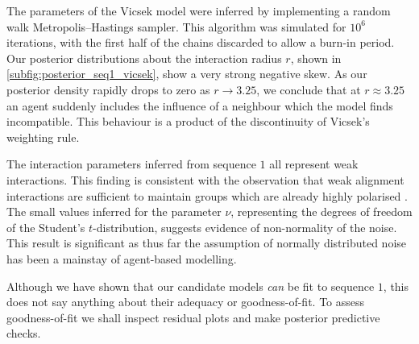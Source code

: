 The parameters of the Vicsek model were inferred by implementing a random walk
Metropolis--Hastings sampler. This algorithm was simulated for $10^6$
iterations, with the first half of the chains discarded to allow a burn-in
period. Our posterior distributions about the interaction radius $r$, shown in
\cref{subfig:posterior_seq1_vicsek}, show a very strong negative skew. As our
posterior density rapidly drops to zero as $r\rightarrow3.25$, we conclude  
that at $r\approx3.25$ an agent suddenly includes the influence of a neighbour
which the model finds incompatible. This behaviour is a product of the
discontinuity of Vicsek's weighting rule.

The interaction parameters inferred from sequence $1$ all represent weak
interactions. This finding is consistent with the observation that weak
alignment interactions are sufficient to maintain groups which are already
highly polarised \parencite{jhawar20}. The small values inferred for the
parameter $\nu$, representing the degrees of freedom of the Student's
$t$-distribution, suggests evidence of non-normality of the noise. This result
is significant as thus far the assumption of normally distributed noise has
been a mainstay of agent-based modelling.

Although we have shown that our candidate models \emph{can} be fit to sequence
$1$, this does not say anything about their adequacy or goodness-of-fit. To
assess goodness-of-fit we shall inspect residual plots and make posterior
predictive checks.

